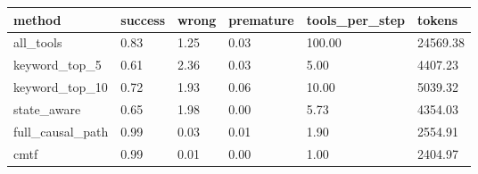 \begin{tabular}{llllll}
\toprule
method & success & wrong & premature & tools_per_step & tokens \\
\midrule
all_tools & 0.83 & 1.25 & 0.03 & 100.00 & 24569.38 \\
keyword_top_5 & 0.61 & 2.36 & 0.03 & 5.00 & 4407.23 \\
keyword_top_10 & 0.72 & 1.93 & 0.06 & 10.00 & 5039.32 \\
state_aware & 0.65 & 1.98 & 0.00 & 5.73 & 4354.03 \\
full_causal_path & 0.99 & 0.03 & 0.01 & 1.90 & 2554.91 \\
cmtf & 0.99 & 0.01 & 0.00 & 1.00 & 2404.97 \\
\bottomrule
\end{tabular}
